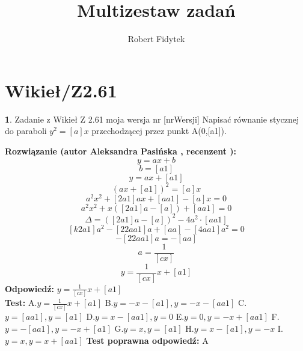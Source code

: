 \documentclass[12pt, a4paper]{article}
\title{Multizestaw zadań}
\author{Robert Fidytek}
\date{}
\theoremstyle{definition} %
\newtheorem{zad}{}
\newcommand{\kategoria}[1]{\section{#1}} %
\newcommand{\zadStart}[1]{\begin{zad}#1\newline} %
\newcommand{\zadStop}{\end{zad}}   %
\newcommand{\rozwStart}[2]{\noindent \textbf{Rozwiązanie (autor #1 , recenzent #2): }\newline} %
\newcommand{\rozwStop}{\newline}                                            %
\newcommand{\odpStart}{\noindent \textbf{Odpowiedź:}\newline}    %
\newcommand{\odpStop}{\newline}                                             %
\newcommand{\testStart}{\noindent \textbf{Test:}\newline} %
\newcommand{\testStop}{\newline} %
\newcommand{\kluczStart}{\noindent \textbf{Test poprawna odpowiedź:}\newline} %
\newcommand{\kluczStop}{\newline} %
\begin{document}
\maketitle


\kategoria{Wikieł/Z2.61}
\zadStart{Zadanie z Wikieł Z 2.61 moja wersja nr [nrWersji]}
Napisać równanie stycznej do paraboli $y^2=[a]x$ przechodzącej przez punkt A(0,[a1]). 
\zadStop
\rozwStart{Aleksandra Pasińska}{}
$$y=ax+b$$
$$b=[a1]$$
$$y=ax+[a1]$$
$$(ax+[a1])^2=[a]x$$
$$a^2x^2+[2a1]ax+[aa1]-[a]x=0$$
$$a^2x^2+x([2a1]a-[a])+[aa1]=0$$
$$\Delta=([2a1]a-[a])^2-4a^2\cdot [aa1]$$
$$[k2a1]a^2-[22aa1]a+[aa]-[4aa1]a^2=0$$
$$-[22aa1]a=-[aa]$$
$$a=\frac{1}{[cx]}$$
$$y=\frac{1}{[cx]}x+[a1]$$
\rozwStop
\odpStart
$y=\frac{1}{[cx]}x+[a1]$\\
\odpStop
\testStart
A.$y=\frac{1}{[cx]}x+[a1]$
B.$ y=-x-[a1], y=-x-[aa1]$
C.$ y=[aa1], y=[a1]$
D.$ y=x-[aa1], y=0$
E.$ y=0, y=-x+[aa1]$
F.$ y=-[aa1], y=-x+[a1]$
G.$ y=x, y=[a1]$
H.$ y=x-[a1], y=-x$
I.$ y=x, y=x+[aa1]$
\testStop
\kluczStart
A
\kluczStop
\end{document}
